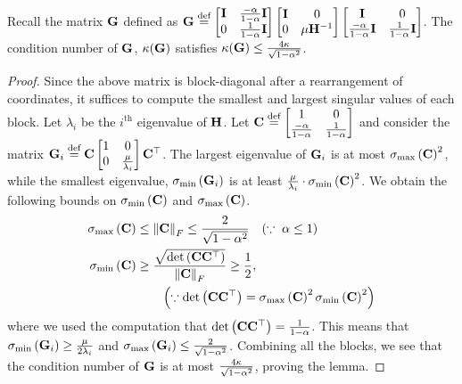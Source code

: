\begin{lemma}\label{lem:G-bound}
	Recall the matrix $\mathbf{G}$ defined as $\mathbf{G} \stackrel{\textrm{def}}{=} \begin{bmatrix} \mathbf{I} & \frac{-\alpha}{1-\alpha}\mathbf{I} \\ 0 & \frac{1}{1-\alpha}\mathbf{I} \end{bmatrix} \begin{bmatrix} \mathbf{I} &0 \\ 0 & {\mu}{\mathbf{H}}^{-1} \end{bmatrix} \begin{bmatrix} \mathbf{I} &0 \\ \frac{-\alpha}{1-\alpha}\mathbf{I} & \frac{1}{1-\alpha}\mathbf{I} \end{bmatrix}$. The condition number of $\mathbf{G}$, $\kappa(\mathbf{G})$ satisfies $\kappa(\mathbf{G})\leq \frac{4{\kappa}}{\sqrt{1-\alpha^2}}$.
\end{lemma}
\begin{proof}
	Since the above matrix is block-diagonal after a rearrangement of coordinates, it suffices to compute the smallest and largest singular values of each block. Let $\lambda_i$ be the $i^{\textrm{th}}$ eigenvalue of $\mathbf{H}$. Let $\mathbf{C} \stackrel{\textrm{def}}{=} \begin{bmatrix} 1 & 0 \\ \frac{-\alpha}{1-\alpha} & \frac{1}{1-\alpha} \end{bmatrix}$ and consider the matrix $\mathbf{G}_i \stackrel{\textrm{def}}{=} \mathbf{C} \begin{bmatrix} 1 & 0 \\ 0 & \frac{\mu}{\lambda_i} \end{bmatrix} \mathbf{C} ^{\top}$. The largest eigenvalue of $\mathbf{G}_i$ is at most $\sigma_{\textrm{max}}\left(\mathbf{C}\right)^2$, while the smallest eigenvalue, $\sigma_{\textrm{min}}\left(\mathbf{G}_i\right)$ is at least $\frac{\mu}{\lambda_i} \cdot \sigma_{\textrm{min}}\left(\mathbf{C}\right)^2$. We obtain the following bounds on $\sigma_{\textrm{min}}\left(\mathbf{C}\right)$ and $\sigma_{\textrm{max}}\left(\mathbf{C}\right)$.
	\begin{align*}
		\sigma_{\textrm{max}}\left(\mathbf{C}\right) &\leq \left\| \mathbf{C} \right\|_F \leq \frac{2}{\sqrt{1-\alpha^2}} \quad (\because \; \alpha \leq 1 ) \\
		\sigma_{\textrm{min}}\left(\mathbf{C}\right) &\geq \frac{\sqrt{\det\left(\mathbf{C} \mathbf{C}^{\top}\right)}}{\left\| \mathbf{C} \right\|_F} \geq \frac{1}{2}, \\ &\qquad \left(\because \det\left(\mathbf{C}\mathbf{C}^{\top}\right) = \sigma_{\textrm{max}}\left(\mathbf{C}\right)^2 \sigma_{\textrm{min}}\left(\mathbf{C}\right)^2\right)
	\end{align*}
	where we used the computation that $\det\left(\mathbf{C} \mathbf{C}^{\top}\right) = \frac{1}{1-\alpha}$. This means that $\sigma_{\textrm{min}}\left(\mathbf{G}_i\right) \geq \frac{\mu}{2\lambda_i}$ and $\sigma_{\textrm{max}}\left(\mathbf{G}_i\right) \leq \frac{2}{\sqrt{1-\alpha^2}}$. Combining all the blocks, we see that the condition number of $\mathbf{G}$ is at most $\frac{4{\kappa}}{\sqrt{1-\alpha^2}}$, proving the lemma.
\end{proof}

